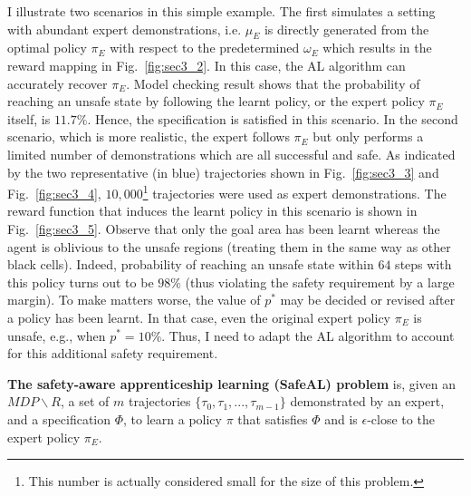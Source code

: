 I illustrate two scenarios in this simple example. The first simulates a setting with abundant expert demonstrations, i.e. $\mu_E$ is directly generated from the optimal policy $\pi_E$ with respect to the predetermined $\omega_E$ which results in the reward mapping in Fig.~\ref{fig:sec3_2}. In this case, the AL algorithm can accurately recover $\pi_E$. 
Model checking result shows that the probability of reaching an unsafe state by following the learnt policy, or the expert policy $\pi_E$ itself, is $11.7\%$. Hence, the specification is satisfied in this scenario. In the second scenario, which is more realistic, the expert follows $\pi_E$ but only performs a limited number of demonstrations which are all successful and safe. As indicated by the two representative (in blue) trajectories shown in Fig.~\ref{fig:sec3_3} and Fig.~\ref{fig:sec3_4}, $10,000$\footnote{This number is actually considered small for the size of this problem.} trajectories were used as expert demonstrations. 
The reward function that induces the learnt policy in this scenario is shown in Fig.~{\ref{fig:sec3_5}}.
Observe that only the goal area has been learnt whereas the agent is oblivious to the unsafe regions (treating them in the same way as other black cells). Indeed, probability of reaching an unsafe state within $64$ steps with this policy turns out to be $98\%$ (thus violating the safety requirement by a large margin).  
To make matters worse, the value of $p^*$ may be decided or revised after a policy has been learnt. In that case, even the original expert policy $\pi_E$ is unsafe, e.g., when $p^*=10\%$. 
Thus, I need to adapt the AL algorithm to account for this additional safety requirement. 
\begin{definition}
\textbf{The safety-aware apprenticeship learning (SafeAL) problem} is, given an $MDP\backslash R$, a set of $m$ trajectories $\{\tau_0, \tau_1, ..., \tau_{m-1}\}$ demonstrated by an expert, and a specification $\Phi$, to learn a policy $\pi$ that satisfies $\Phi$ and is $\epsilon$-close to the expert policy $\pi_E$.
\end{definition}

